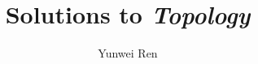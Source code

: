 

\title{Solutions to \textit{Topology}}
\author{Yunwei Ren}
\date{}


\maketitle
\tableofcontents

\newpage
\setcounter{section}{1}




